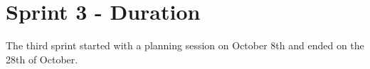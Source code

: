 \section{Sprint 3 - Duration}
The third sprint started with a planning session on October 8th and ended on the 28th of October. 

